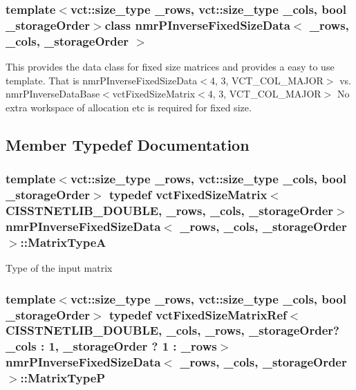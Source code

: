 \subsubsection*{template$<$vct\-::size\-\_\-type \-\_\-rows, vct\-::size\-\_\-type \-\_\-cols, bool \-\_\-storage\-Order$>$class nmr\-P\-Inverse\-Fixed\-Size\-Data$<$ \-\_\-rows, \-\_\-cols, \-\_\-storage\-Order $>$}

This provides the data class for fixed size matrices and provides a easy to use template. That is nmr\-P\-Inverse\-Fixed\-Size\-Data$<$4, 3, V\-C\-T\-\_\-\-C\-O\-L\-\_\-\-M\-A\-J\-O\-R$>$ vs. nmr\-P\-Inverse\-Data\-Base$<$vct\-Fixed\-Size\-Matrix$<$4, 3, V\-C\-T\-\_\-\-C\-O\-L\-\_\-\-M\-A\-J\-O\-R$>$ No extra workspace of allocation etc is required for fixed size. 

\subsection{Member Typedef Documentation}
\hypertarget{classnmr_p_inverse_fixed_size_data_a3ea248e2be6732ed0138508f1dae09d6}{
\subsubsection[{Matrix\-Type\-A}]{\setlength{\rightskip}{0pt plus 5cm}template$<$vct\-::size\-\_\-type \-\_\-rows, vct\-::size\-\_\-type \-\_\-cols, bool \-\_\-storage\-Order$>$ typedef {\bf vct\-Fixed\-Size\-Matrix}$<$C\-I\-S\-S\-T\-N\-E\-T\-L\-I\-B\-\_\-\-D\-O\-U\-B\-L\-E, \-\_\-rows, \-\_\-cols, \-\_\-storage\-Order$>$ {\bf nmr\-P\-Inverse\-Fixed\-Size\-Data}$<$ \-\_\-rows, \-\_\-cols, \-\_\-storage\-Order $>$\-::{\bf Matrix\-Type\-A}}}\label{classnmr_p_inverse_fixed_size_data_a3ea248e2be6732ed0138508f1dae09d6}
Type of the input matrix \hypertarget{classnmr_p_inverse_fixed_size_data_abbeb86284eb856bc18f108e80906b04d}{
\subsubsection[{Matrix\-Type\-P}]{\setlength{\rightskip}{0pt plus 5cm}template$<$vct\-::size\-\_\-type \-\_\-rows, vct\-::size\-\_\-type \-\_\-cols, bool \-\_\-storage\-Order$>$ typedef {\bf vct\-Fixed\-Size\-Matrix\-Ref}$<$C\-I\-S\-S\-T\-N\-E\-T\-L\-I\-B\-\_\-\-D\-O\-U\-B\-L\-E, \-\_\-cols, \-\_\-rows, \-\_\-storage\-Order? \-\_\-cols \-: 1, \-\_\-storage\-Order ? 1 \-: \-\_\-rows$>$ {\bf nmr\-P\-Inverse\-Fixed\-Size\-Data}$<$ \-\_\-rows, \-\_\-cols, \-\_\-storage\-Order $>$\-::{\bf Matrix\-Type\-P}}}\label{classnmr_p_inverse_fixed_size_data_abbeb86284eb856bc18f108e80906b04d}
